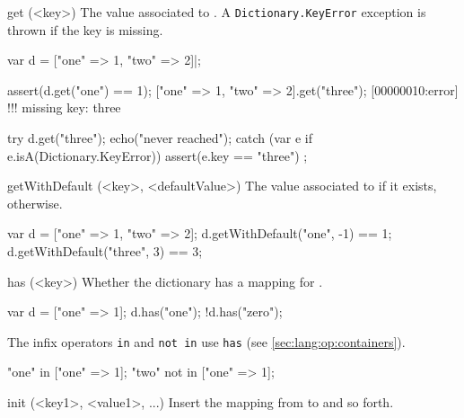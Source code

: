 \begin{urbiscriptapi}

\item[get](<key>)%
  The value associated to .  A \lstinline|Dictionary.KeyError|
  exception is thrown if the key is missing.
\begin{urbiscript}
var d = ["one" => 1, "two" => 2]|;

assert(d.get("one") == 1);
["one" => 1, "two" => 2].get("three");
[00000010:error] !!! missing key: three

try
{
  d.get("three");
  echo("never reached");
}
catch (var e if e.isA(Dictionary.KeyError))
{
  assert(e.key == "three")
};
\end{urbiscript}


\item[getWithDefault](<key>, <defaultValue>)%
  The value associated to  if it exists, 
  otherwise.

\begin{urbiassert}
var d = ["one" => 1, "two" => 2];
d.getWithDefault("one",  -1) == 1;
d.getWithDefault("three", 3) == 3;
\end{urbiassert}


\item[has](<key>)%
  Whether the dictionary has a mapping for .

\begin{urbiassert}
var d = ["one" => 1];
d.has("one");
!d.has("zero");
\end{urbiassert}

  The infix operators \lstinline|in| and \lstinline|not in| use
  \lstinline|has| (see \autoref{sec:lang:op:containers}).

\begin{urbiassert}
"one" in     ["one" => 1];
"two" not in ["one" => 1];
\end{urbiassert}


\item[init](<key1>, <value1>, ...)%
  Insert the mapping from  to  and so forth.


\end{urbiscriptapi}
